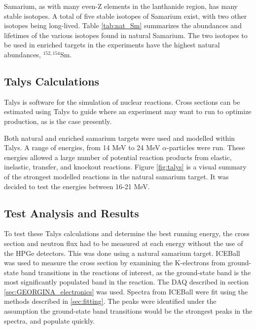 Samarium, as with many even-Z elements in the lanthanide region, has many stable isotopes. A total of five stable isotopes of Samarium exist, with two other isotopes being long-lived. Table \ref{tab:nat_Sm} summarizes the abundances and lifetimes of the various isotopes found in natural Samarium. The two isotopes to be used in enriched targets in the experiments have the highest natural abundances, $^{152,154}$Sm.



\subsection{Talys Calculations}

Talys \citep{koning07:_talys} is software for the simulation of nuclear reactions. Cross sections can be estimated using Talys to guide where an experiment may want to run to optimize production, as is the case presently. 

Both natural and enriched samarium targets were used and modelled within Talys. A range of energies, from 14 MeV to 24 MeV $\alpha$-particles were run. These energies allowed a large number of potential reaction products from elastic, inelastic, transfer, and knockout reactions. Figure \ref{fig:talys} is a visual summary of the strongest modelled reactions in the natural samarium target. It was decided to test the energies between 16-21 MeV.



\subsection{Test Analysis and Results}

To test these Talys calculations and determine the best running energy, the cross section and neutron flux had to be measured at each energy without the use of the HPGe detectors. This was done using a natural samarium target. ICEBall was used to measure the cross section by examining the K-electrons from ground-state band transitions in the reactions of interest, as the ground-state band is the most significantly populated band in the reaction. The DAQ described in section \ref{sec:GEORGINA_electronics} was used. Spectra from ICEBall were fit using the methods described in \ref{sec:fitting}. The peaks were identified under the assumption the ground-state band transitions would be the strongest peaks in the spectra, and populate quickly. 

